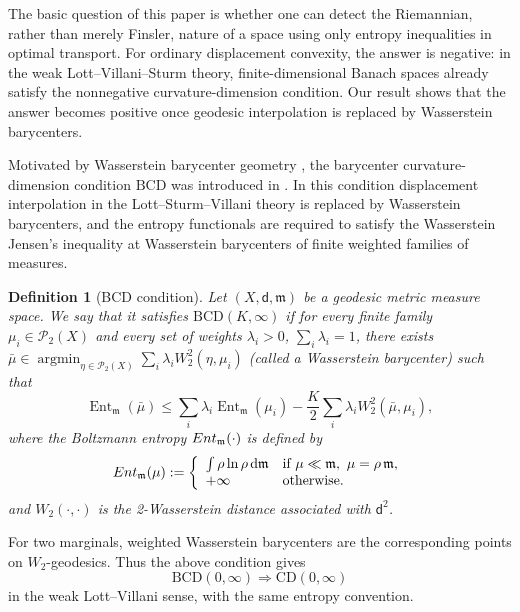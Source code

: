 \documentclass[10pt,a4paper]{amsart}
\numberwithin{equation}{section}
\newtheorem{definition}[theorem]{Definition}
\newcommand{\Ent}{\operatorname{Ent}}
\newcommand{\argmin}{\operatorname*{argmin}}
\newcommand{\dd}{\mathrm d}
\newcommand{\cP}{\mathcal P}
\newcommand{\mm}{\mathfrak m}
\begin{document}
	\medskip
	The basic question of this paper is whether one can detect the
Riemannian, rather than merely Finsler, nature of a space using only
entropy inequalities in optimal transport.
For ordinary displacement convexity, the answer is negative: in the weak
Lott--Villani--Sturm theory, finite-dimensional Banach spaces already satisfy
the nonnegative curvature-dimension condition. Our result shows that the
answer becomes positive once geodesic interpolation is replaced by
Wasserstein barycenters.


	Motivated by Wasserstein barycenter geometry \cite{AguehCarlier,KimPass}, the barycenter curvature-dimension condition \(\mathrm{BCD}\) was introduced in \cite{HanLiuZhuBCD,HanLiuZhuSurvey}. In this condition displacement interpolation in the Lott--Sturm--Villani theory is replaced by Wasserstein barycenters, and the entropy functionals are required to satisfy the Wasserstein Jensen's inequality at Wasserstein barycenters of finite weighted families of measures.
	
	
	
	\begin{definition}[BCD condition]
		\label{def:bcd-infty}
		Let $(X,\mathsf{d},\mathfrak{m})$ be a geodesic metric measure space. We say that it satisfies $\mathrm{BCD}(K,\infty)$ if for every finite family \(\mu_i\in\cP_2(X)\) and every set of weights $\lambda_i>0$, $\sum_i\lambda_i=1$, there exists $\bar\mu \in\argmin_{\eta\in \cP_2(X)} \sum_{i}\lambda_i W_2^2(\eta,\mu_i)$ (called a Wasserstein barycenter) such that
		\begin{equation}\label{jensen}
			\Ent_\mm(\bar\mu)\le \sum_i\lambda_i\Ent_\mm(\mu_i)-\frac{K}{2} \sum_{i}\lambda_i W_2^2(\bar{\mu},\mu_i),
		\end{equation}
			where the Boltzmann entropy ${\rm Ent}_\mm(\cdot)$ is defined by
			\begin{equation*}
				{\rm Ent}_\mm(\mu):=
				\left \{\begin{array}{ll}
					\int \rho\ln \rho\,\dd\mm &\text{if } \mu\ll \mm,\ \mu=\rho\,\mm,\\
					+\infty &\text{otherwise}.
				\end{array}\right.
			\end{equation*}
			and $W_2(\cdot,\cdot)$
		is the 2-Wasserstein distance associated with $\mathsf{d}^2$. 
		
	\end{definition}
	
	
	
	For two marginals, weighted Wasserstein barycenters are the corresponding points on \(W_2\)-geodesics. Thus the above condition gives
	\[
	\mathrm{BCD}(0,\infty)\Longrightarrow \mathrm{CD}(0,\infty)
	\]
	in the weak Lott--Villani sense, with the same entropy convention. 
	
\end{document}
